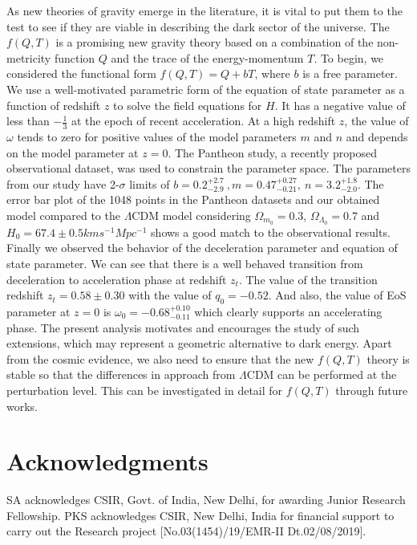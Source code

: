 As new theories of gravity emerge in the literature, it is vital to put them to the test to see if they are viable in describing the dark sector of the universe. The $f(Q,T)$ is a promising new gravity theory based on a combination of the non-metricity function $Q$ and the trace of the energy-momentum $T$. To begin, we considered the functional form $f(Q,T) = Q+bT$, where $b$ is a free parameter.\\
We use a well-motivated parametric form of the equation of state parameter as a function of redshift $z$ to solve the field equations for $H$. It has a negative value of less than $-\frac{1}{3}$ at the epoch of recent acceleration. At a high redshift $z$, the value of $\omega$ tends to zero for positive values of the model parameters $m$ and $n$ and depends on the model parameter at $z = 0$. The Pantheon study, a recently proposed observational dataset, was used to constrain the parameter space. The parameters from our study have 2-$\sigma$ limits of $b = 0.2^{+2.7}_{-2.9} \ , m = 0.47^{+0.27}_{-0.21},\ n = 3.2^{+1.8}_{-2.0}$.
The error bar plot of the 1048 points in the Pantheon datasets and our obtained model compared to the $\Lambda$CDM model considering $\Omega_{m_{0}}= 0.3$, $\Omega_{\Lambda_{0}} = 0.7$ and $H_{0}= 67.4\pm 0.5km s^{-1}Mpc^{-1}$ shows a good match to the observational results.\\
Finally we observed the behavior of the deceleration parameter and equation of state parameter. We can see that there is a well behaved transition from deceleration to acceleration phase at redshift $z_{t}$. The value of the transition redshift $z_{t}= 0.58 \pm 0.30$ with the value of $q_{0}= -0.52$. And also, the value of EoS parameter at $z=0$ is $\omega_{0}= -0.68^{+0.10}_{-0.11}$ which clearly supports an accelerating phase. The present analysis motivates and encourages the study of such extensions, which may represent a geometric alternative to dark energy. Apart from the cosmic evidence, we also need to ensure that the new $f(Q, T)$ theory is stable so that the differences in approach from $\Lambda$CDM can be performed at the perturbation level. This can be investigated in detail for $f(Q, T)$ through future works.

\section*{Acknowledgments}

SA acknowledges CSIR, Govt. of India, New Delhi, for awarding Junior Research Fellowship. PKS acknowledges CSIR, New Delhi, India for financial
support to carry out the Research project [No.03(1454)/19/EMR-II Dt.02/08/2019].

